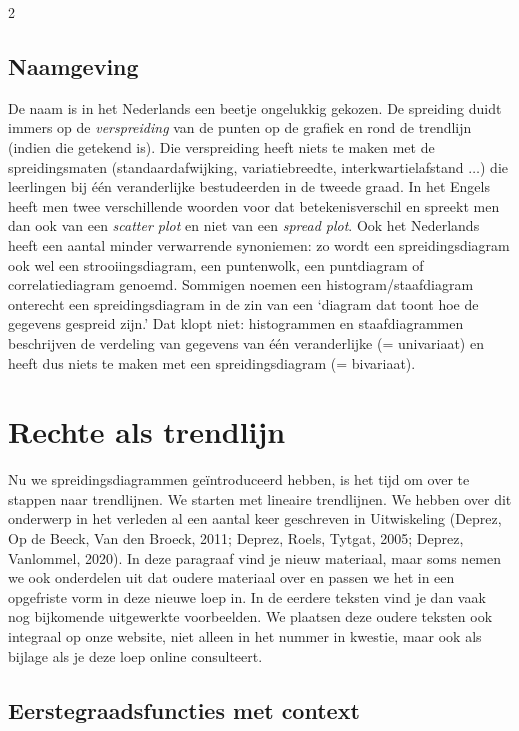 \begin{multicols}{2}
\subsection{Naamgeving}
De naam  is in het Nederlands een beetje ongelukkig gekozen. De spreiding duidt immers op de \textit{verspreiding} van de punten op de grafiek en rond de trendlijn (indien die getekend is). Die verspreiding heeft niets te maken met de spreidingsmaten (standaardafwijking, variatiebreedte, interkwartielafstand $\ldots$) die leerlingen bij één veranderlijke bestudeerden in de tweede graad. In het Engels heeft men twee verschillende woorden voor dat betekenisverschil en spreekt men dan ook van een \textit{scatter plot} en niet van een \textit{spread plot}. Ook het Nederlands heeft een aantal minder verwarrende synoniemen: zo wordt een spreidingsdiagram ook wel een strooiingsdiagram, een puntenwolk, een puntdiagram of correlatiediagram genoemd. 
Sommigen noemen een histogram/staafdiagram onterecht een spreidingsdiagram in de zin van een ‘diagram dat toont hoe de gegevens gespreid zijn.' Dat klopt niet: histogrammen en staafdiagrammen beschrijven de verdeling van gegevens van één veranderlijke (= univariaat) en heeft dus niets te maken met een spreidingsdiagram (= bivariaat).


	\section{Rechte als trendlijn}

Nu we spreidingsdiagrammen geïntroduceerd hebben, is het tijd om over te stappen naar trendlijnen. We starten met lineaire trendlijnen. We hebben over dit onderwerp in het verleden al een aantal keer geschreven in Uitwiskeling (Deprez, Op de Beeck, Van den Broeck, 2011; Deprez, Roels, Tytgat, 2005; Deprez, Vanlommel, 2020). In deze paragraaf vind je nieuw materiaal, maar soms nemen we ook onderdelen uit dat oudere materiaal over en passen we het in een opgefriste vorm in deze nieuwe loep in. In de eerdere teksten vind je dan vaak nog bijkomende uitgewerkte voorbeelden. We plaatsen deze oudere teksten ook integraal op onze website, niet alleen in het nummer in kwestie, maar ook als bijlage als je deze loep online consulteert.

   \subsection{Eerstegraadsfuncties met context} \label{section:eerstegraadsfuncties met context}
   

\end{multicols}
